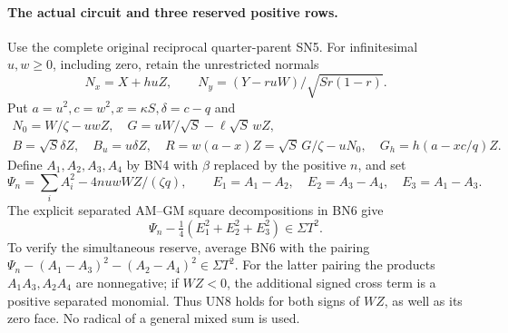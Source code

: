 \paragraph{The actual circuit and three reserved positive rows.}
Use the complete original reciprocal quarter-parent SN5. For
infinitesimal $u,w\ge0$, including zero, retain the unrestricted
normals
\[
 N_x=X+huZ,\qquad N_y=(Y-ruW)/\sqrt{Sr(1-r)}.
 \tag{UN5}
\]
Put $a=u^2,c=w^2,x=\kappa S,\delta=c-q$ and
\[
\begin{gathered}
 N_0=W/\zeta-uwZ,\quad G=uW/\sqrt S-\ell\sqrt S\,wZ,\\
 B=\sqrt S\delta Z,\quad B_u=u\delta Z,\quad
 R=w(a-x)Z=\sqrt S\,G/\zeta-uN_0,\quad
 G_h=h(a-xc/q)Z.
\end{gathered}\tag{UN6}
\]
Define $A_1,A_2,A_3,A_4$ by BN4 with $\beta$ replaced by the
positive $n$, and set
\[
 \Psi_n=\sum_iA_i^2-4nuwWZ/(\zeta q),\qquad
 E_1=A_1-A_2,\quad E_2=A_3-A_4,\quad E_3=A_1-A_3.
 \tag{UN7}
\]
The explicit separated AM--GM square decompositions in BN6 give
\[
             \Psi_n-\tfrac14(E_1^2+E_2^2+E_3^2)\in\Sigma T^2.
 \tag{UN8}
\]
To verify the simultaneous reserve, average BN6 with the pairing
$\Psi_n-(A_1-A_3)^2-(A_2-A_4)^2\in\Sigma T^2$.
For the latter pairing the products $A_1A_3,A_2A_4$ are nonnegative;
if $WZ<0$, the additional signed cross term is a positive separated
monomial. Thus UN8 holds for both signs of $WZ$, as well as its
zero face. No radical of a general mixed sum is used.

